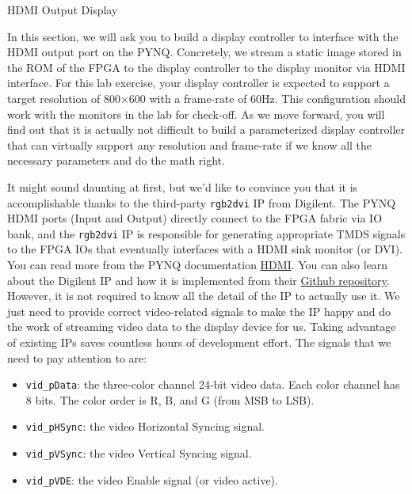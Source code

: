 \documentclass[11pt]{article}
\makeatletter
\renewcommand{\section}
{\@startsection {section}{1}{0pt}
 {-2ex}
 {1ex}
 {\bfseries\Large}}
\makeatother
\begin{document}
\section{HDMI Output Display}

In this section, we will ask you to build a display controller to interface with the HDMI output port on the PYNQ. Concretely, we stream a static image stored in the ROM of the FPGA to the display controller to the display monitor via HDMI interface. For this lab exercise, your display controller is expected to support a target resolution of 800$\times$600 with a frame-rate of 60Hz. This configuration should work with the monitors in the lab for check-off. As we move forward, you will find out that it is actually not difficult to build a parameterized display controller that can virtually support any resolution and frame-rate if we know all the necessary parameters and do the math right.

It might sound daunting at first, but we'd like to convince you that it is accomplishable thanks to the third-party \verb|rgb2dvi| IP from Digilent. The PYNQ HDMI ports (Input and Output) directly connect to the FPGA fabric via IO bank, and the \verb|rgb2dvi| IP is responsible for generating appropriate TMDS signals to the FPGA IOs that eventually interfaces with a HDMI sink monitor (or DVI). You can read more from the PYNQ documentation \href{https://reference.digilentinc.com/reference/programmable-logic/pynq-z1/reference-manual#hdmi}{HDMI}. You can also learn about the Digilent IP and how it is implemented from their \href{https://github.com/Digilent/vivado-library}{Github repository}. However, it is not required to know all the detail of the IP to actually use it. We just need to provide correct video-related signals to make the IP happy and do the work of streaming video data to the display device for us. Taking advantage of existing IPs saves countless hours of development effort. The signals that we need to pay attention to are:

\begin{itemize}
  \item \verb|vid_pData|: the three-color channel 24-bit video data. Each color channel has 8 bits. The color order is R, B, and G (from MSB to LSB).
  \item \verb|vid_pHSync|: the video Horizontal Syncing signal.
  \item \verb|vid_pVSync|: the video Vertical Syncing signal.
  \item \verb|vid_pVDE|: the video Enable signal (or video active).
\end{itemize}
\end{document}
